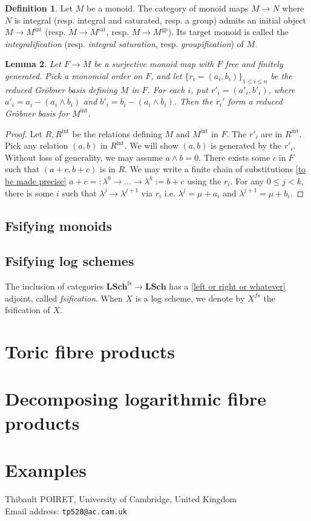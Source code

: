 \documentclass[a4paper,12pt]{amsart} %
\numberwithin{equation}{subsection}
\newcommand{\LSch}{\cat{LSch}}
\newcommand{\LSchfs}{\cat{LSch}^{\on{fs}}}
\renewcommand{\in}{\operatorname{in}}
\newcommand{\on}[1]{\operatorname{#1}}
\newcommand{\bd}[1]{{\mathbf{#1}}}
\newcommand{\cat}[1]{\bd{#1}}
\def\sat{{\rm sat}}
\def\gp{\textrm{gp}}
\def\int{\textrm{int}}
\def\sat{\textrm{sat}}
\theoremstyle{definition}
\newtheorem{definition}{Definition}[section]
\theoremstyle{plain}%
\newtheorem{lemma}[definition]{Lemma}
\theoremstyle{remark}
\begin{document}
\begin{definition}
	Let $M$ be a monoid. The category of monoid maps $M \to N$ where $N$ is integral (resp. integral and saturated, resp. a group) admits an initial object $M \to M^\int$ (resp. $M \to M^\sat$, resp. $M \to M^\gp$). Its target monoid is called the \emph{integralification} (resp. \emph{integral saturation}, resp. \emph{groupification}) of $M$.
\end{definition}

\begin{lemma}
	Let $F \to M$ be a surjective monoid map with $F$ free and finitely generated. Pick a monomial order on $F$, and let $\{r_i=(a_i,b_i)\}_{1\leq i\leq n}$ be the reduced Gr\"obner basis defining $M$ in $F$. For each $i$, put $r'_i=(a'_i,b'_i)$, where $a'_i=a_i-(a_i\wedge b_i)$ and $b'_i=b_i-(a_i\wedge b_i)$. Then the $r_i'$ form a reduced Gr\"obner basis for $M^\int$.
\end{lemma}

\begin{proof}
	Let $R,R^\int$ be the relations defining $M$ and $M^\int$ in $F$. The $r'_i$ are in $R^\int$. Pick any relation $(a,b)$ in $R^\int$. We will show $(a,b)$ is generated by the $r'_i$. Without loss of generality, we may assume $a\wedge b=0$. There exists some $c\in F$ such that $(a+c,b+c)$ is in $R$. We may write a finite chain of substitutions \ref{to be made precise} $a+c=:\lambda^0 \to \dots \to \lambda^k:=b+c$ using the $r_i$. For any $0\leq j<k$, there is some $i$ such that $\lambda^j \to \lambda^{j+1}$ via $r_i$ i.e. $\lambda^j=\mu+a_i$ and $\lambda^{j+1}=\mu+b_i$.
\end{proof}


\subsection{Fsifying monoids}

\subsection{Fsifying log schemes}
The inclusion of categories $\LSchfs \to \LSch$ has a \ref{left or right or whatever} adjoint, called \emph{fsification}. When $X$ is a log scheme, we denote by $X^{fs}$ the fsification of $X$.

\section{Toric fibre products}

\section{Decomposing logarithmic fibre products}

\section{Examples}





\bigskip

\noindent
Thibault POIRET,
{\sc University of Cambridge, United Kingdom} \\
Email address: {\tt tp528@ac.cam.uk}
\end{document}
